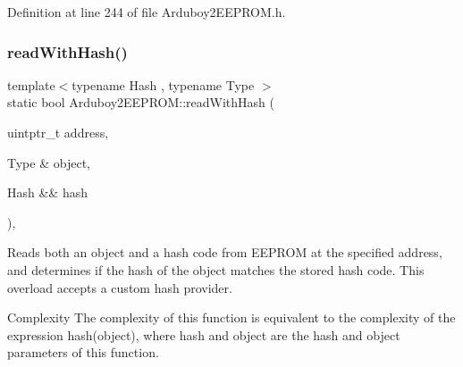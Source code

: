 Definition at line 244 of file Arduboy2\+E\+E\+P\+R\+O\+M.\+h.

\mbox{\label{classArduboy2EEPROM_a6b0ef10b0c2f082b2c55a6e002802512}} 
\subsubsection{\texorpdfstring{readWithHash()}{readWithHash()}\hspace{0.1cm}{\footnotesize\ttfamily [2/2]}}
{\footnotesize\ttfamily template$<$typename Hash , typename Type $>$ \\
static bool Arduboy2\+E\+E\+P\+R\+O\+M\+::read\+With\+Hash (\begin{DoxyParamCaption}\item[{uintptr\+\_\+t}]{address,  }\item[{Type \&}]{object,  }\item[{Hash \&\&}]{hash }\end{DoxyParamCaption})\hspace{0.3cm}{\ttfamily [inline]}, {\ttfamily [static]}}



Reads both an object and a hash code from E\+E\+P\+R\+OM at the specified address, and determines if the hash of the object matches the stored hash code. This overload accepts a custom hash provider. 

\begin{DoxyParagraph}{Complexity}
The complexity of this function is equivalent to the complexity of the expression {\ttfamily hash(object)}, where {\ttfamily hash} and {\ttfamily object} are the {\ttfamily hash} and {\ttfamily object} parameters of this function.
\end{DoxyParagraph}

